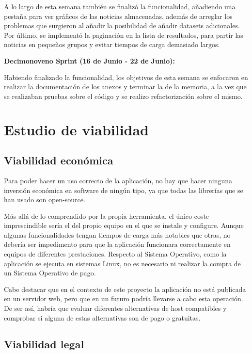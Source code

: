 A lo largo de esta semana también se finalizó la funcionalidad, añadiendo una pestaña para ver gráficos de las noticias almacenadas, además de arreglar los problemas que surgieron al añadir la posibilidad de añadir datasets adicionales. Por último, se implementó la paginación en la lista de resultados, para partir las noticias en pequeños grupos y evitar tiempos de carga demasiado largos.



\textbf{Decimonoveno Sprint (16 de Junio - 22 de Junio):}

Habiendo finalizado la funcionalidad, los objetivos de esta semana se enfocaron en realizar la documentación de los anexos y terminar la de la memoria, a la vez que se realizaban pruebas sobre el código y se realizo refactorización sobre el mismo.


\section{Estudio de viabilidad}

\subsection{Viabilidad económica}

Para poder hacer un uso correcto de la aplicación, no hay que hacer ninguna inversión económica en software de ningún tipo, ya que todas las librerías que se han usado son open-source.

Más allá de lo comprendido por la propia herramienta, el único coste imprescindible sería el del propio equipo en el que se instale y configure. Aunque algunas funcionalidades tengan tiempos de carga más notables que otras, no debería ser impedimento para que la aplicación funcionara correctamente en equipos de diferentes prestaciones. Respecto al Sistema Operativo, como la aplicación se ejecuta en sistemas Linux, no es necesario ni realizar la compra de un Sistema Operativo de pago.

Cabe destacar que en el contexto de este proyecto la aplicación no está publicada en un servidor web, pero que en un futuro podría llevarse a cabo esta operación. De ser así, habría que evaluar diferentes alternativas de host compatibles y comprobar si alguna de estas alternativas son de pago o gratuitas.

\subsection{Viabilidad legal}


